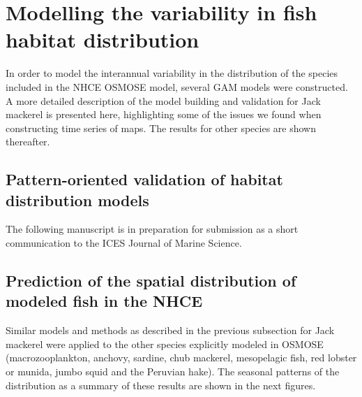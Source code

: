 \section{Modelling the variability in fish habitat distribution}

In order to model the interannual variability in the distribution of the species included in the NHCE OSMOSE model, several GAM models were constructed. A more detailed description of the model building and validation for Jack mackerel is presented here, highlighting some of the issues we found when constructing time series of maps. The results for other species are shown thereafter.

\subsection[Pattern--oriented validation of habitat distribution models]{Pattern-oriented validation of habitat distribution models}

The following manuscript is in preparation for submission as a short communication to the ICES Journal of Marine Science.



\subsection{Prediction of the spatial distribution of modeled fish in the NHCE} 

Similar models and methods as described in the previous subsection for Jack mackerel were applied to the other species explicitly modeled in OSMOSE (macrozooplankton, anchovy, sardine, chub mackerel, mesopelagic fish, red lobster or munida, jumbo squid and the Peruvian hake). The seasonal patterns of the distribution as a summary of these results are shown in the next figures.

